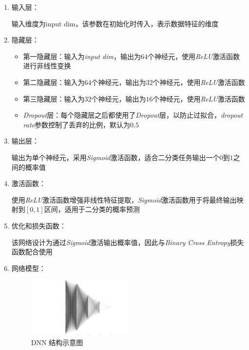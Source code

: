 \documentclass[a4paper]{article}
\begin{document}
\begin{enumerate}
  \item 输入层：

  输入维度为input dim，该参数在初始化时传入，表示数据特征的维度
  \item 
  {
    隐藏层：
    \begin{itemize}
      \item 第一隐藏层：输入为\emph{input dim}，输出为$64$个神经元，使用\emph{ReLU}激活函数进行非线性变换
      \item 第二隐藏层：输入为$64$个神经元，输出为$32$个神经元，使用\emph{ReLU}激活函数
      \item 第三隐藏层：输入为$32$个神经元，输出为$16$个神经元，使用\emph{ReLU}激活函数
      \item \emph{Dropout}层：每个隐藏层之后都使用了\emph{Dropout}层，以防止过拟合，\emph{dropout rate}参数控制了丢弃的比例，默认为$0.5$
    \end{itemize}
  }
  \item 输出层：
  
  输出为单个神经元，采用\emph{Sigmoid}激活函数，适合二分类任务输出一个$0$到$1$之间的概率值
  \item 激活函数：

  使用\emph{ReLU}激活函数增强非线性特征提取，\emph{Sigmoid}激活函数用于将最终输出映射到$\left[0, 1\right]$区间，适用于二分类的概率预测
  \item 优化和损失函数：
  
  该网络设计为通过\emph{Sigmoid}激活输出概率值，因此与\emph{Binary Cross Entropy}损失函数配合使用
  \item 网络模型：
  \begin{figure}[H]
    \centering
    \includegraphics[width=0.5\textwidth]{figs/nn.pdf}
    \caption{DNN 结构示意图}
    \label{{fig:DNN}}
  \end{figure}
\end{enumerate}
\end{document}
